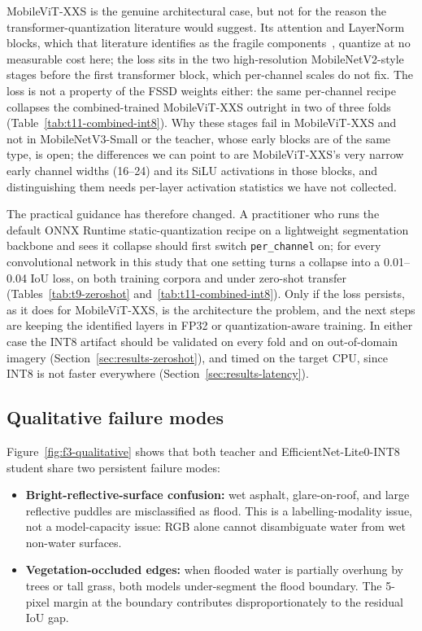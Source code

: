 MobileViT-XXS is the genuine architectural case, but not for the reason the transformer-quantization literature would suggest. Its attention and LayerNorm blocks, which that literature identifies as the fragile components~\cite{lin2022fqvit,li2023repqvit}, quantize at no measurable cost here; the loss sits in the two high-resolution MobileNetV2-style stages before the first transformer block, which per-channel scales do not fix. The loss is not a property of the FSSD weights either: the same per-channel recipe collapses the combined-trained MobileViT-XXS outright in two of three folds (Table~\ref{tab:t11-combined-int8}). Why these stages fail in MobileViT-XXS and not in MobileNetV3-Small or the teacher, whose early blocks are of the same type, is open; the differences we can point to are MobileViT-XXS's very narrow early channel widths (16--24) and its SiLU activations in those blocks, and distinguishing them needs per-layer activation statistics we have not collected.

The practical guidance has therefore changed. A practitioner who runs the default ONNX Runtime static-quantization recipe on a lightweight segmentation backbone and sees it collapse should first switch \texttt{per\_channel} on; for every convolutional network in this study that one setting turns a collapse into a 0.01--0.04 IoU loss, on both training corpora and under zero-shot transfer (Tables~\ref{tab:t9-zeroshot} and~\ref{tab:t11-combined-int8}). Only if the loss persists, as it does for MobileViT-XXS, is the architecture the problem, and the next steps are keeping the identified layers in FP32 or quantization-aware training. In either case the INT8 artifact should be validated on every fold and on out-of-domain imagery (Section~\ref{sec:results-zeroshot}), and timed on the target CPU, since INT8 is not faster everywhere (Section~\ref{sec:results-latency}).

\subsection{Qualitative failure modes}
\label{sec:discussion-failures}

Figure~\ref{fig:f3-qualitative} shows that both teacher and EfficientNet-Lite0-INT8 student share two persistent failure modes:
\begin{itemize}
\item \textbf{Bright-reflective-surface confusion:} wet asphalt, glare-on-roof, and large reflective puddles are misclassified as flood. This is a labelling-modality issue, not a model-capacity issue: RGB alone cannot disambiguate water from wet non-water surfaces.
\item \textbf{Vegetation-occluded edges:} when flooded water is partially overhung by trees or tall grass, both models under-segment the flood boundary. The 5-pixel margin at the boundary contributes disproportionately to the residual IoU gap.
\end{itemize}

